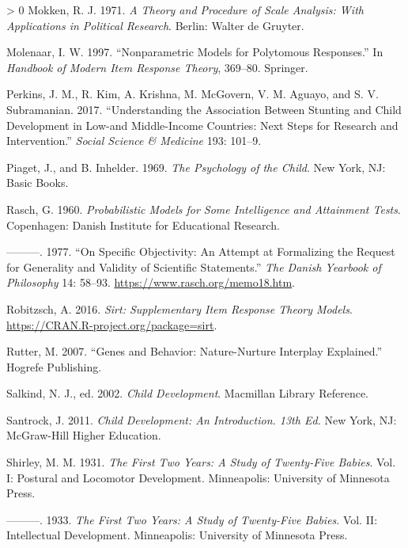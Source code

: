\documentclass[
]{book}
\newlength{\cslhangindent}
\newenvironment{CSLReferences}[3] %
 {%
  \setlength{\parindent}{0pt}
  \ifodd #1 \everypar{\setlength{\hangindent}{\cslhangindent}}\ignorespaces\fi
  \ifnum #2 > 0
  \setlength{\parskip}{#2\baselineskip}
  \fi
 }%
 {}
\begin{document}
\begin{CSLReferences}{1}{0}
\leavevmode\hypertarget{ref-mokken1971}{}%
Mokken, R. J. 1971. \emph{A Theory and Procedure of Scale Analysis: With Applications in Political Research}. Berlin: Walter de Gruyter.

\leavevmode\hypertarget{ref-molenaar1997}{}%
Molenaar, I. W. 1997. {``Nonparametric Models for Polytomous Responses.''} In \emph{Handbook of Modern Item Response Theory}, 369--80. Springer.

\leavevmode\hypertarget{ref-perkins2017understanding}{}%
Perkins, J. M., R. Kim, A. Krishna, M. McGovern, V. M. Aguayo, and S. V. Subramanian. 2017. {``Understanding the Association Between Stunting and Child Development in Low-and Middle-Income Countries: Next Steps for Research and Intervention.''} \emph{Social Science \& Medicine} 193: 101--9.

\leavevmode\hypertarget{ref-piaget1969}{}%
Piaget, J., and B. Inhelder. 1969. \emph{The Psychology of the Child}. New York, NJ: Basic Books.

\leavevmode\hypertarget{ref-rasch1960}{}%
Rasch, G. 1960. \emph{Probabilistic Models for Some Intelligence and Attainment Tests}. Copenhagen: Danish Institute for Educational Research.

\leavevmode\hypertarget{ref-rasch1977}{}%
---------. 1977. {``On Specific Objectivity: An Attempt at Formalizing the Request for Generality and Validity of Scientific Statements.''} \emph{The Danish Yearbook of Philosophy} 14: 58--93. \url{https://www.rasch.org/memo18.htm}.

\leavevmode\hypertarget{ref-robitzsch2016}{}%
Robitzsch, A. 2016. \emph{Sirt: Supplementary Item Response Theory Models}. \url{https://CRAN.R-project.org/package=sirt}.

\leavevmode\hypertarget{ref-rutter2007genes}{}%
Rutter, M. 2007. {``Genes and Behavior: Nature-Nurture Interplay Explained.''} Hogrefe Publishing.

\leavevmode\hypertarget{ref-salkind2002}{}%
Salkind, N. J., ed. 2002. \emph{Child Development}. Macmillan Library Reference.

\leavevmode\hypertarget{ref-santrock2010}{}%
Santrock, J. 2011. \emph{Child Development: An Introduction. 13th Ed.} New York, NJ: McGraw-Hill Higher Education.

\leavevmode\hypertarget{ref-shirley1931}{}%
Shirley, M. M. 1931. \emph{The First Two Years: A Study of Twenty-Five Babies}. Vol. I: Postural and Locomotor Development. Minneapolis: University of Minnesota Press.

\leavevmode\hypertarget{ref-shirley1933}{}%
---------. 1933. \emph{The First Two Years: A Study of Twenty-Five Babies}. Vol. II: Intellectual Development. Minneapolis: University of Minnesota Press.


\end{CSLReferences}
\end{document}
